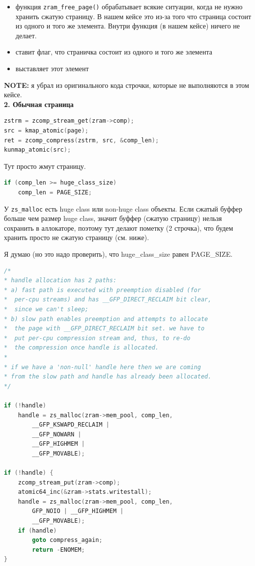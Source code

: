 \documentclass[12pt]{report}
\begin{document}
\begin{itemize}
	\item функция \texttt{zram\_free\_page()} обрабатывает всякие ситуации, когда не нужно хранить сжатую страницу. В нашем кейсе это из-за того что страница состоит из одного и того же элемента. Внутри функция (в нашем кейсе) ничего не делает.
	\item ставит флаг, что страничка состоит из одного и того же элемента
	\item выставляет этот элемент
\end{itemize} 

\textbf{NOTE:} я убрал из оригинального кода строчки, которые не выполняются в этом кейсе.\\

\textbf{2. Обычная страница}

\begin{lstlisting}[language=c]
zstrm = zcomp_stream_get(zram->comp);
src = kmap_atomic(page);
ret = zcomp_compress(zstrm, src, &comp_len);
kunmap_atomic(src);
\end{lstlisting}

Тут просто жмут страницу.\\

\begin{lstlisting}[language=c]
if (comp_len >= huge_class_size)
	comp_len = PAGE_SIZE;
\end{lstlisting}

У \texttt{zs\_malloc} есть huge class или non-huge class объекты. Если сжатый буффер больше чем размер huge class, значит буффер (сжатую страницу) нельзя сохранить в аллокаторе, поэтому тут делают пометку (2 строчка), что будем хранить просто не сжатую страницу (см. ниже).

Я думаю (но это надо проверить), что huge\_class\_size равен PAGE\_SIZE. \\

\begin{lstlisting}[language=c]
/*
* handle allocation has 2 paths:
* a) fast path is executed with preemption disabled (for
*  per-cpu streams) and has __GFP_DIRECT_RECLAIM bit clear,
*  since we can't sleep;
* b) slow path enables preemption and attempts to allocate
*  the page with __GFP_DIRECT_RECLAIM bit set. we have to
*  put per-cpu compression stream and, thus, to re-do
*  the compression once handle is allocated.
*
* if we have a 'non-null' handle here then we are coming
* from the slow path and handle has already been allocated.
*/

if (!handle)
	handle = zs_malloc(zram->mem_pool, comp_len,
		__GFP_KSWAPD_RECLAIM |
		__GFP_NOWARN |
		__GFP_HIGHMEM |
		__GFP_MOVABLE);
	
if (!handle) {
	zcomp_stream_put(zram->comp);
	atomic64_inc(&zram->stats.writestall);
	handle = zs_malloc(zram->mem_pool, comp_len,
		GFP_NOIO | __GFP_HIGHMEM |
		__GFP_MOVABLE);
	if (handle)
		goto compress_again;
		return -ENOMEM;
}
\end{lstlisting}
\end{document}
